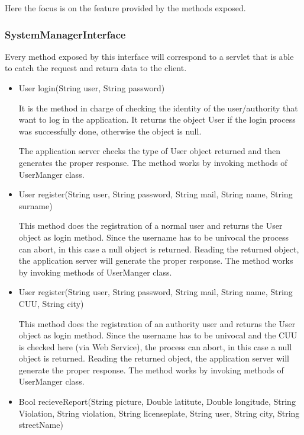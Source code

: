 Here the focus is on the feature provided by the methods exposed.

\subsubsection{SystemManagerInterface}
Every method exposed by this interface will correspond to a servlet that is able to catch the request and return data to the client.
\begin{itemize}
	\item 
	User login(String user, String password)
	
	It is the method in charge of checking the identity of the user/authority that want to log in the application. It returns the object User if the login process was successfully done, otherwise the object is null. 
	
	The application server checks the type of User object returned and then generates the proper response.
	The method works by invoking methods of UserManger class.
	
	\item 
	User register(String user, String password, String mail, String name, String surname)
	
	This method does the registration of a normal user and returns the User object as login method. Since the username has to be univocal the process can abort, in this case a null object is returned.
	Reading the returned object, the application server will generate the proper response.
	The method works by invoking methods of UserManger class.
	
	\item 
	User register(String user, String password, String mail, String name, String CUU, String city)
	
	This method does the registration of an authority user and returns the User object as login method. Since the username has to be univocal and the CUU is checked here (via Web Service), the process can abort, in this case a null object is returned.
	Reading the returned object, the application server will generate the proper response.
	The method works by invoking methods of UserManger class.
	
	\item
	 Bool recieveReport(String picture, Double latitute, Double longitude, String Violation, String violation, String licenseplate, String user, String city, String streetName)
	 

\end{itemize}
